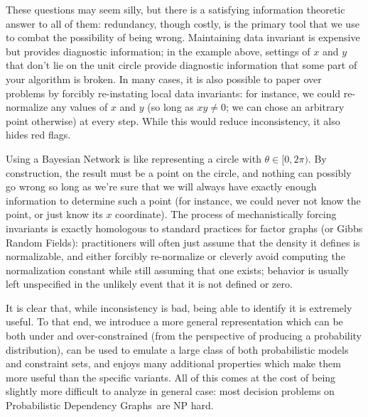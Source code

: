 \documentclass{article}
\newcommand{\modelnames}{Probabilistic Dependency Graphs}
\begin{document}
	These questions may seem silly, but there is a satisfying information theoretic answer to all of them: redundancy, though costly, is the primary tool that we use to combat the possibility of being wrong. Maintaining data invariant is expensive but provides diagnostic information; in the example above, settings of $x$ and $y$ that don't lie on the unit circle provide diagnostic information that some part of your algorithm is broken. In many cases, it is also possible to paper over problems by forcibly re-instating local data invariants: for instance, we could re-normalize any values of $x$ and $y$ (so long as $xy \neq 0$; we can chose an arbitrary point otherwise) at every step. While this would reduce inconsistency, it also hides red flags. 
	
	Using a Bayesian Network is like representing a circle with $\theta \in [0, 2\pi)$. By construction, the result must be a point on the circle, and nothing can possibly go wrong so long as we're sure that we will always have exactly enough information to determine such a point (for instance, we could never not know the point, or just know its $x$ coordinate). 
	The process of mechanistically forcing invariants is exactly homologous to standard practices for factor graphs (or Gibbs Random Fields): practitioners will often just assume that the density it defines is normalizable, and either forcibly re-normalize or cleverly avoid computing the normalization constant while still assuming that one exists; behavior is usually left unspecified in the unlikely event that it is not defined or zero. 
	
	It is clear that, while inconsistency is bad, being able to identify it is extremely useful. To that end, we introduce a more general representation which can be both under and over-constrained (from the perspective of producing a probability distribution), can be used to emulate a large class of both probabilistic models and constraint sets, and enjoys many additional properties which make them more useful than the specific variants. All of this comes at the cost of being slightly more difficult to analyze in general case: most decision problems on \modelnames\ are NP hard. %
	
\end{document}
